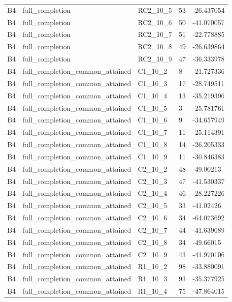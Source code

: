 \begin{longtable}{lllll}
B4 & full\_completion & RC2\_10\_5 & 53 & -26.437054 \\
B4 & full\_completion & RC2\_10\_6 & 50 & -41.070057 \\
B4 & full\_completion & RC2\_10\_7 & 51 & -22.778885 \\
B4 & full\_completion & RC2\_10\_8 & 49 & -26.639864 \\
B4 & full\_completion & RC2\_10\_9 & 47 & -36.333978 \\
B4 & full\_completion\_common\_attained & C1\_10\_2 & 8 & -21.727336 \\
B4 & full\_completion\_common\_attained & C1\_10\_3 & 17 & -28.749511 \\
B4 & full\_completion\_common\_attained & C1\_10\_4 & 13 & -35.219396 \\
B4 & full\_completion\_common\_attained & C1\_10\_5 & 3 & -25.781761 \\
B4 & full\_completion\_common\_attained & C1\_10\_6 & 9 & -34.657949 \\
B4 & full\_completion\_common\_attained & C1\_10\_7 & 11 & -25.114391 \\
B4 & full\_completion\_common\_attained & C1\_10\_8 & 14 & -26.205333 \\
B4 & full\_completion\_common\_attained & C1\_10\_9 & 11 & -30.846383 \\
B4 & full\_completion\_common\_attained & C2\_10\_2 & 48 & -49.00213 \\
B4 & full\_completion\_common\_attained & C2\_10\_3 & 47 & -41.530337 \\
B4 & full\_completion\_common\_attained & C2\_10\_4 & 46 & -28.227226 \\
B4 & full\_completion\_common\_attained & C2\_10\_5 & 33 & -41.02426 \\
B4 & full\_completion\_common\_attained & C2\_10\_6 & 34 & -64.073692 \\
B4 & full\_completion\_common\_attained & C2\_10\_7 & 44 & -41.639689 \\
B4 & full\_completion\_common\_attained & C2\_10\_8 & 34 & -49.66015 \\
B4 & full\_completion\_common\_attained & C2\_10\_9 & 43 & -41.970106 \\
B4 & full\_completion\_common\_attained & R1\_10\_2 & 98 & -33.880091 \\
B4 & full\_completion\_common\_attained & R1\_10\_3 & 93 & -35.377925 \\
B4 & full\_completion\_common\_attained & R1\_10\_4 & 75 & -47.864015 \\

\end{longtable}
